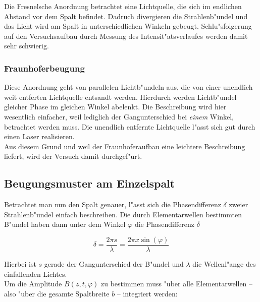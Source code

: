 			Die Fresnelsche Anordnung betrachtet eine Lichtquelle, die sich im endlichen Abstand vor dem Spalt befindet.
			Dadruch divergieren die Strahlenb"undel und das Licht wird am Spalt in unterschiedlichen Winkeln gebeugt.
			Schlu"sfolgerung auf den Versuchsaufbau durch Messung des Intensit"atsverlaufes werden damit sehr schwierig.

		\subsubsection{Fraunhoferbeugung}
			\label{subsubsec:fraunhofer}

			Diese Anordnung geht von parallelen Lichtb"undeln aus, die von einer unendlich weit entferten Lichtquelle entsandt werden.
			Hierdurch werden Lichtb"undel gleicher Phase im gleichen Winkel abelenkt.
			Die Beschreibung wird hier wesentlich einfacher, weil lediglich der Gangunterschied bei \emph{einem} Winkel, betrachtet werden muss.
			Die unendlich entfernte Lichtquelle l"asst sich gut durch einen Laser realisieren.\\

			Aus diesem Grund und weil der Fraunhoferaufbau eine leichtere Beschreibung liefert, wird der Versuch damit durchgef"urt.

	\subsection{Beugungsmuster am Einzelspalt}
		\label{subsec:herleitung}
		\label{subsec:muster_einzelspalt}

		Betrachtet man nun den Spalt genauer, l"asst sich die Phasendifferenz $\delta$ zweier Strahlenb"undel einfach beschreiben. Die durch Elementarwellen bestimmten B"undel haben dann unter dem Winkel $\varphi$ die Phasendifferenz $\delta$

		\begin{equation}
			\delta = \frac{2 \pi s}{\lambda} = \frac{2 \pi x \sin(\varphi)}{\lambda}
		\end{equation}

		Hierbei ist $s$ gerade der Gangunterschied der B"undel und $\lambda$ die Wellenl"ange des einfallenden Lichtes.\\
		Um die Amplitude $B(z, t, \varphi)$ zu bestimmen muss "uber alle Elementarwellen -- also "uber die gesamte Spaltbreite $b$ -- integriert werden:

